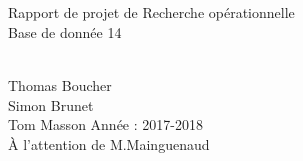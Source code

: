 \begin{titlepage}
\begin{sffamily}
\begin{center}

~\\[1cm]
\HRule
\\[0.5cm]
{\huge {\selectfont
 Rapport de projet de Recherche opérationnelle \\[0.5cm]
Base de donnée 14}}
\\[0.4cm]
\HRule
\end{center}



\\
Thomas Boucher \\
Simon Brunet \\
Tom Masson  \hfill Année : 2017-2018\\
\hfill {\`A l'attention de M.Mainguenaud}

\end{sffamily}
\end{titlepage}
